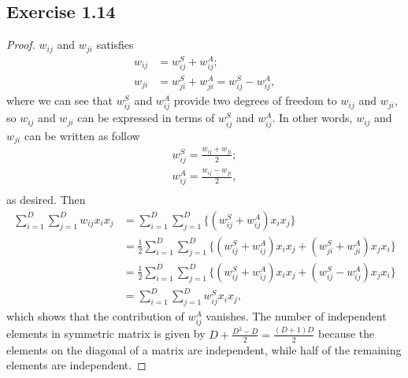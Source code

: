 \documentclass[11pt]{article}
\theoremstyle{definition}
\begin{document}
\subsection{Exercise 1.14}
\begin{proof}
$w_{ij}$ and $w_{ji}$ satisfies
\begin{align*}
    w_{ij} &= w_{ij}^S + w_{ij}^A; \\
    w_{ji} &= w_{ji}^S + w_{ji}^A = w_{ij}^S - w_{ij}^A,
\end{align*}
where we can see that $w_{ij}^S$ and $w_{ij}^A$ provide two degrees of freedom to $w_{ij}$ and $w_{ji}$, so $w_{ij}$ and $w_{ji}$ can be expressed in terms of $w_{ij}^S$ and $w_{ij}^A$. In other words, $w_{ij}$ and $w_{ji}$ can be written as follow
\begin{align*}
w_{ij}^S = \frac{w_{ij} + w_{ji}}{2};\\
w_{ij}^A = \frac{w_{ij} - w_{ji}}{2},\\
\end{align*}
as desired. Then
\begin{align*}
\sum^D_{i=1}\sum^D_{j=1}w_{ij}x_ix_j &= \sum^D_{i=1}\sum^D_{j=1}\{(w_{ij}^S+w_{ij}^A)x_ix_j\} \\
&= \frac{1}{2}\sum^D_{i=1}\sum^D_{j=1}\{(w_{ij}^S+w_{ij}^A)x_ix_j + (w_{ji}^S+w_{ji}^A)x_jx_i\}\\
&= \frac{1}{2}\sum^D_{i=1}\sum^D_{j=1}\{(w_{ij}^S+w_{ij}^A)x_ix_j + (w_{ij}^S-w_{ij}^A)x_jx_i\}\\
&=\sum^D_{i=1}\sum^D_{j=1}w_{ij}^Sx_ix_j,
\end{align*}
which shows that the contribution of $w_{ij}^A$ vanishes. The number of independent elements in symmetric matrix is given by $D + \frac{D^2-D}{2} = \frac{(D+1)D}{2}$ because the elements on the diagonal of a matrix are independent, while half of the remaining elements are independent.
\end{proof}
\end{document}
